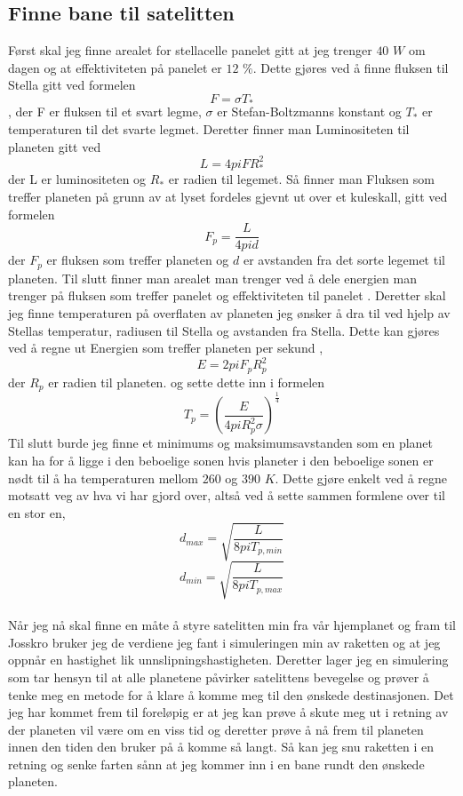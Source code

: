 \documentclass[11pt, A4paper, norsk]{report}
\begin{document}
		\subsection{Finne bane til satelitten}
Først skal jeg finne arealet for stellacelle panelet gitt at jeg trenger $40$ $W$ om dagen og at effektiviteten på panelet er $12$ $\%$.
Dette gjøres ved å finne fluksen til Stella gitt ved formelen \cite{1D} $$F = \sigma T_{*}$$, der F er fluksen til et svart legme, $\sigma$ er Stefan-Boltzmanns konstant og $T_{*}$ er temperaturen til det svarte legmet. Deretter finner man Luminositeten til planeten gitt ved \cite{1D} $$L = 4 pi F R_{*}^2$$ der L er luminositeten og $R_{*}$ er radien til legemet. Så finner man Fluksen som treffer planeten på grunn av at lyset fordeles gjevnt ut over et kuleskall, gitt ved formelen \cite{1D} $$F_p = \frac{L}{4 pi d}$$ der $F_p$ er fluksen
som treffer planeten og $d$ er avstanden fra det sorte legemet til planeten. Til slutt finner man arealet man trenger ved å dele energien man trenger på fluksen som treffer panelet og effektiviteten til panelet \cite{1D}. 
Deretter skal jeg finne temperaturen på overflaten av planeten jeg ønsker å dra til ved hjelp av Stellas temperatur, radiusen til Stella og avstanden fra Stella. Dette kan gjøres ved å regne ut Energien som treffer planeten per sekund \cite{1D}, $$E = 2 pi F_p R_p^2$$ der $R_p$ er radien til planeten. og sette dette inn i formelen \cite{1D} $$T_p = \left(\frac{E}{4 pi R_p^2 \sigma}\right)^{\frac{1}{4}}$$
Til slutt burde jeg finne et minimums og maksimumsavstanden som en planet kan ha for å ligge i den beboelige sonen hvis planeter i den beboelige sonen er nødt til å ha temperaturen mellom $260$ og $390$ $K$. Dette gjøre enkelt ved å regne motsatt veg av hva vi har gjord over, altså ved å sette sammen formlene over til en stor en, $$d_{max} = \sqrt{\frac{L}{8 pi T_{p, min}}}$$ $$d_{min} = \sqrt{\frac{L}{8 pi T_{p, max}}}$$ \\

Når jeg nå skal finne en måte å styre satelitten min fra vår hjemplanet og fram til Josskro bruker jeg de verdiene jeg fant i simuleringen min av raketten og at jeg oppnår en hastighet lik unnslipningshastigheten. Deretter lager jeg en simulering som tar hensyn til at alle planetene påvirker satelittens bevegelse og prøver å tenke meg en metode for å klare å komme meg til den ønskede destinasjonen. Det jeg har kommet frem til foreløpig er at jeg kan prøve å skute meg ut i retning av der planeten vil være om en viss tid og deretter prøve å nå frem til planeten innen den tiden den bruker på å komme så langt. Så kan jeg snu raketten i en retning og senke farten sånn at jeg kommer inn i en bane rundt den ønskede planeten.
\end{document}
